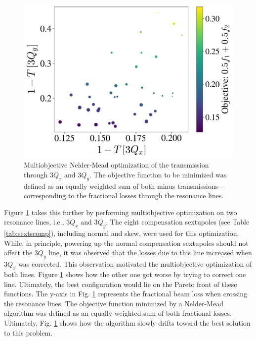 \begin{figure}[H]
    \centering
    \includegraphics[width=\columnwidth]{chapter4/mo_opti.png}
    \caption{Multiobjective Nelder-Mead optimization of the transmission through $3Q_x$ and $3Q_y$. The objective function to be minimized was defined as an equally weighted sum of both minus transmissions---corresponding to the fractional losses through the resonance lines.}
    \label{fig:MO_neldermead}
\end{figure}

Figure \ref{fig:MO_neldermead} takes this further by performing multiobjective optimization on two resonance lines, i.e., $3Q_x$ and $3Q_y$. The eight compensation sextupoles (see Table \ref{tab:sextscomp}), including normal and skew, were used for this optimization. While, in principle, powering up the normal compensation sextupoles should not affect the $3Q_y$ line, it was observed that the losses due to this line increased when $3Q_x$ was corrected. This observation motivated the multiobjective optimization of both lines. Figure \ref{fig:MO_neldermead} shows how the other one got worse by trying to correct one line. Ultimately, the best configuration would lie on the Pareto front of these functions. The y-axis in Fig. \ref{fig:MO_neldermead} represents the fractional beam loss when crossing the resonance lines. The objective function minimized by a Nelder-Mead algorithm was defined as an equally weighted sum of both fractional losses. Ultimately, Fig. \ref{fig:MO_neldermead} shows how the algorithm slowly drifts toward the best solution to this problem. 

